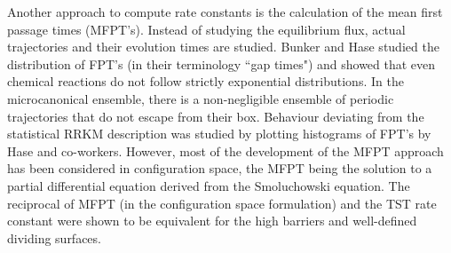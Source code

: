 Another approach to compute rate constants is the calculation of the mean first passage times (MFPT's).
Instead of studying the equilibrium flux, actual trajectories and their evolution times are studied.
Bunker and Hase studied the distribution of FPT's (in their terminology ``gap times")\cite{Bunker1973} and showed that even chemical reactions do not follow strictly exponential distributions.
In the microcanonical ensemble, there is a non-negligible ensemble of periodic trajectories that do not escape from their box.
Behaviour deviating from the statistical RRKM description was studied by plotting histograms of FPT's by Hase and co-workers.\cite{Lourderaj2009}
However, most of the development of the MFPT approach has been considered in configuration space, the MFPT being the solution to a partial differential equation derived from the Smoluchowski equation.\cite{Hanggi1990}
The reciprocal of MFPT (in the configuration space formulation) and the TST rate constant were shown to be equivalent for the high barriers and well-defined dividing surfaces.\cite{Hanggi1990, Muller1997}

